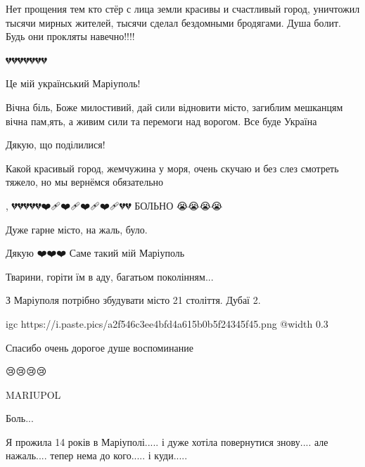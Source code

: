 
Нет прощения тем кто стёр с лица земли красивы и счастливый город, уничтожил
тысячи мирных жителей, тысячи сделал бездомными бродягами. Душа болит. Будь они
прокляты навечно!!!!


💔💔💔💔💔💔💔


Це мій український Маріуполь!


Вічна біль, Боже милостивий, дай сили відновити місто, загиблим мешканцям вічна
пам,ять, а живим сили та перемоги над ворогом. Все буде Україна


Дякую, що поділилися!


Какой красивый город, жемчужина у моря, очень скучаю и без слез смотреть
тяжело, но мы вернёмся обязательно

,
💔💔💔💔💔❤️🩹❤️🩹❤️🩹❤️🩹💔💔
БОЛЬНО 😭😭😭😭


Дуже гарне місто, на жаль, було.


Дякую ❤️❤️❤️ Саме такий мій Маріуполь


Тварини, горіти їм в аду, багатьом поколінням...


З Маріуполя потрібно збудувати місто 21 століття.
Дубаї 2.


\ifcmt
  igc https://i.paste.pics/a2f546c3ee4bfd4a615b0b5f24345f45.png
	@width 0.3
\fi


Спасибо очень дорогое душе воспоминание


😢😢😢😢


MARIUPOL💛💙😢😢😢


Боль...


Я прожила 14 років в Маріуполі..... і дуже хотіла повернутися знову.... але
нажаль.... тепер нема до кого..... і куди.....

